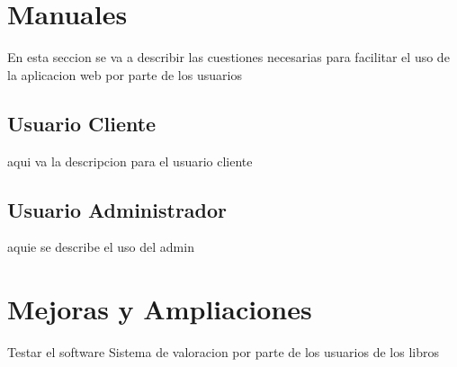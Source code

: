 \documentclass[a4paper]{report}
\begin{document}
    \section{Manuales}
    En esta seccion se va a describir las cuestiones necesarias para facilitar el uso de la aplicacion web por parte de los usuarios
        \subsection{Usuario Cliente}
    aqui va la descripcion para el usuario cliente
        \subsection{Usuario Administrador}
    aquie se describe el uso del admin

    \section{Mejoras y Ampliaciones}
    Testar el software
    Sistema de valoracion por parte de los usuarios de los libros
\end{document}
